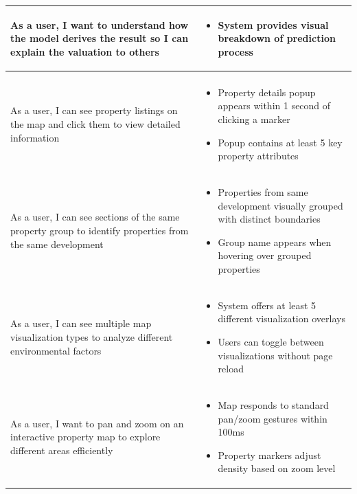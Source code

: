 \begin{longtable}{>{\raggedright\arraybackslash}p{}>{\raggedright\arraybackslash}p{}}
	As a user, I want to understand how the model derives the result so I can explain the valuation to others &
	\begin{itemize}
	\item System provides visual breakdown of prediction process
	\end{itemize} \\
	
	\midrule
	\multicolumn{2}{l}{\textbf{Geospatial Visualization}} \\
	\midrule
	As a user, I can see property listings on the map and click them to view detailed information &
	\begin{itemize}
	\item Property details popup appears within 1 second of clicking a marker
	\item Popup contains at least 5 key property attributes
	\end{itemize} \\
	  
	\rowcolor[gray]{0.95}
	As a user, I can see sections of the same property group to identify properties from the same development &
	\begin{itemize}
	\item Properties from same development visually grouped with distinct boundaries
	\item Group name appears when hovering over grouped properties
	\end{itemize} \\
	  
	As a user, I can see multiple map visualization types to analyze different environmental factors &
	\begin{itemize}
	\item System offers at least 5 different visualization overlays
	\item Users can toggle between visualizations without page reload
	\end{itemize} \\
	  
	\rowcolor[gray]{0.95}
	As a user, I want to pan and zoom on an interactive property map to explore different areas efficiently &
	\begin{itemize}
	\item Map responds to standard pan/zoom gestures within 100ms
	\item Property markers adjust density based on zoom level
	\end{itemize} \\
	  

\end{longtable}
